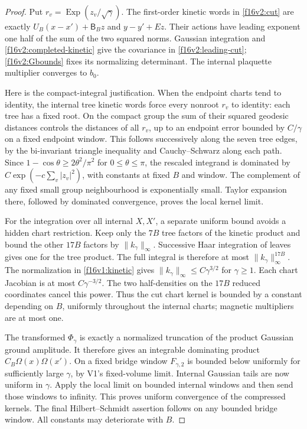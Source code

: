 \documentclass[11pt,oneside]{article}
\begin{document}
\begin{proof}
Put \(r_v=\operatorname{Exp}(z_v/\sqrt\gamma)\).
The first-order kinetic words in \eqref{f16v2:cut} are exactly
\(U_B(x-x')+\mathsf B_Bz\) and \(y-y'+Ez\).
Their actions have leading exponent one half of the sum of
the two squared norms. Gaussian integration and
\eqref{f16v2:completed-kinetic} give the covariance in
\eqref{f16v2:leading-cut}; \eqref{f16v2:Gbounds} fixes its
normalizing determinant. The internal plaquette multiplier
converges to \(b_0\).

Here is the compact-integral justification.
When the endpoint charts tend to identity, the internal tree
kinetic words force every nonroot \(r_v\) to identity: each
tree has a fixed root. On the compact group the sum of their
squared geodesic distances controls the distances of all
\(r_v\), up to an endpoint error bounded by \(C/\gamma\)
on a fixed endpoint window. This follows successively along
the seven tree edges, by the bi-invariant triangle inequality
and Cauchy--Schwarz along each path. Since
\(1-\cos\theta\ge2\theta^2/\pi^2\) for \(0\le\theta\le\pi\),
the rescaled integrand is dominated by
\(C\exp(-c\sum_v|z_v|^2)\), with constants at fixed \(B\)
and window. The complement of any fixed small group
neighbourhood is exponentially small. Taylor expansion there,
followed by dominated convergence, proves the local kernel limit.

For the integration over all internal \(X,X'\), a separate
uniform bound avoids a hidden chart restriction.
Keep only the \(7B\) tree factors of the kinetic product and
bound the other \(17B\) factors by \(\|k_\gamma\|_\infty\).
Successive Haar integration of leaves gives one for the tree
product. The full integral is therefore at most
\(\|k_\gamma\|_\infty^{17B}\).
The normalization in \eqref{f16v1:kinetic} gives
\(\|k_\gamma\|_\infty\le C\gamma^{3/2}\) for \(\gamma\ge1\).
Each chart Jacobian is at most \(C\gamma^{-3/2}\).
The two half-densities on the \(17B\) reduced coordinates
cancel this power. Thus the cut chart kernel is bounded by
a constant depending on \(B\), uniformly throughout the
internal charts; magnetic multipliers are at most one.

The transformed \(\Phi_\gamma\) is exactly a normalized
truncation of the product Gaussian ground amplitude.
It therefore gives an integrable dominating product
\(C_B\Omega(x)\Omega(x')\).
On a fixed bridge window \(F_{\gamma,2}\) is bounded below
uniformly for sufficiently large \(\gamma\), by V1's
fixed-volume limit. Internal Gaussian tails are now uniform
in \(\gamma\). Apply the local limit on bounded internal
windows and then send those windows to infinity.
This proves uniform convergence of the compressed kernels.
The final Hilbert--Schmidt assertion follows on any bounded
bridge window. All constants may deteriorate with \(B\).
\end{proof}
\end{document}
